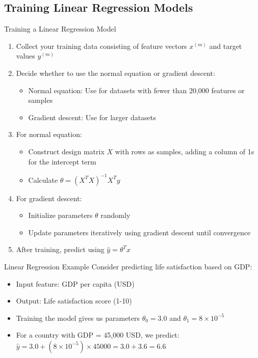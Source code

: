 \multend




\subsection{Training Linear Regression Models}

\begin{KR}{Training a Linear Regression Model}
\begin{enumerate}
    \item Collect your training data consisting of feature vectors $x^{(m)}$ and target values $y^{(m)}$
    \item Decide whether to use the normal equation or gradient descent:
    \begin{itemize}
        \item Normal equation: Use for datasets with fewer than 20,000 features or samples
        \item Gradient descent: Use for larger datasets
    \end{itemize}
    \item For normal equation:
    \begin{itemize}
        \item Construct design matrix $X$ with rows as samples, adding a column of 1s for the intercept term
        \item Calculate $\theta = (X^T X)^{-1}X^T y$
    \end{itemize}
    \item For gradient descent:
    \begin{itemize}
        \item Initialize parameters $\theta$ randomly
        \item Update parameters iteratively using gradient descent until convergence
    \end{itemize}
    \item After training, predict using $\hat{y} = \theta^T x$
\end{enumerate}
\end{KR}

\begin{example2}{Linear Regression Example}
Consider predicting life satisfaction based on GDP:
\begin{itemize}
    \item Input feature: GDP per capita (USD)
    \item Output: Life satisfaction score (1-10)
    \item Training the model gives us parameters $\theta_0 = 3.0$ and $\theta_1 = 8 \times 10^{-5}$
    \item For a country with GDP = 45,000 USD, we predict:
    $\hat{y} = 3.0 + (8 \times 10^{-5}) \times 45000 = 3.0 + 3.6 = 6.6$
\end{itemize}
\end{example2}




